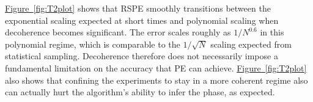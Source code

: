 \documentclass[aps,pra,amsmath,twocolumn,amssymb,superscriptaddress]{revtex4-1}
\newcommand{\fig}[1]{\hyperref[fig:#1]{Figure~\ref*{fig:#1}}}
\begin{document}
%
%

\fig{T2plot} shows that RSPE smoothly transitions between the exponential scaling expected at short times and polynomial scaling when decoherence becomes significant.  The error scales roughly as $1/N^{0.6}$ in this polynomial regime, which is comparable to the $1/\sqrt{N}$ scaling expected from statistical sampling.  Decoherence therefore does not necessarily impose a fundamental limitation on the accuracy that PE can achieve.  \fig{T2plot} also shows that confining the experiments to stay in a more coherent regime also can actually hurt the algorithm's ability to infer the phase, as expected.
\end{document}
